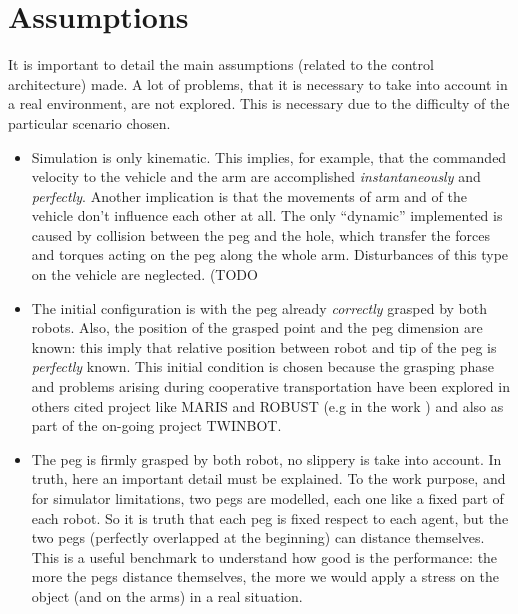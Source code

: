 \section{Assumptions}
It is important to detail the main assumptions (related to the control architecture) made. A lot of problems, that it is necessary to take into account in a real environment, are not explored. This is necessary due to the difficulty of the particular scenario chosen.
\begin{itemize}
	\item Simulation is only kinematic. This implies, for example, that the commanded velocity to the vehicle and the arm are accomplished \textit{instantaneously} and \textit{perfectly}. Another implication is that the movements of arm and of the vehicle don't influence each other at all. The only \enquote{dynamic} implemented is caused by collision between the peg and the hole, which transfer the forces and torques acting on the peg along the whole arm. Disturbances of this type on the vehicle are neglected. (TODO %
	
	\item The initial configuration is with the peg already \textit{correctly} grasped by both robots. Also, the position of the grasped point and the peg dimension are known: this imply that relative position between robot and tip of the peg is \textit{perfectly} known. This initial condition is chosen because the grasping phase and problems arising during cooperative transportation have been explored in others cited project like MARIS and ROBUST (e.g in the work \cite{IntroMaris2}) and also as part of the on-going project TWINBOT.
	
	\item The peg is firmly grasped by both robot, no slippery is take into account. In truth, here an important detail must be explained. To the work purpose, and for simulator limitations, two pegs are modelled, each one like a fixed part of each robot. So it is truth that each peg is fixed respect to each agent, but the two pegs (perfectly overlapped at the beginning) can distance themselves. This is a useful benchmark to understand how good is the performance: the more the pegs distance themselves, the more we would apply a stress on the object (and on the arms) in a real situation.
	

\end{itemize}
